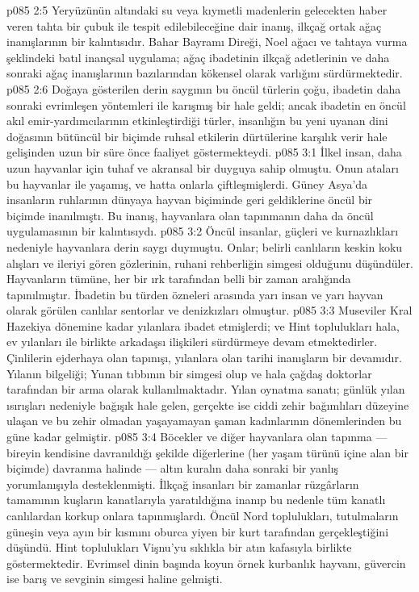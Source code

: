 \vs p085 2:5 Yeryüzünün altındaki su veya kıymetli madenlerin gelecekten haber veren tahta bir çubuk ile tespit edilebileceğine dair inanış, ilkçağ ortak ağaç inanışlarının bir kalıntısıdır. Bahar Bayramı Direği, Noel ağacı ve tahtaya vurma şeklindeki batıl inançsal uygulama; ağaç ibadetinin ilkçağ adetlerinin ve daha sonraki ağaç inanışlarının bazılarından kökensel olarak varlığını sürdürmektedir.
\vs p085 2:6 Doğaya gösterilen derin saygının bu öncül türlerin çoğu, ibadetin daha sonraki evrimleşen yöntemleri ile karışmış bir hale geldi; ancak ibadetin en öncül akıl emir\hyp{}yardımcılarının etkinleştirdiği türler, insanlığın bu yeni uyanan dini doğasının bütüncül bir biçimde ruhsal etkilerin dürtülerine karşılık verir hale gelişinden uzun bir süre önce faaliyet göstermekteydi.
\vs p085 3:1 İlkel insan, daha uzun hayvanlar için tuhaf ve akransal bir duyguya sahip olmuştu. Onun ataları bu hayvanlar ile yaşamış, ve hatta onlarla çiftleşmişlerdi. Güney Asya’da insanların ruhlarının dünyaya hayvan biçiminde geri geldiklerine öncül bir biçimde inanılmıştı. Bu inanış, hayvanlara olan tapınmanın daha da öncül uygulamasının bir kalıntısıydı.
\vs p085 3:2 Öncül insanlar, güçleri ve kurnazlıkları nedeniyle hayvanlara derin saygı duymuştu. Onlar; belirli canlıların keskin koku alışları ve ileriyi gören gözlerinin, ruhani rehberliğin simgesi olduğunu düşündüler. Hayvanların tümüne, her bir ırk tarafından belli bir zaman aralığında tapınılmıştır. İbadetin bu türden özneleri arasında yarı insan ve yarı hayvan olarak görülen canlılar sentorlar ve denizkızları olmuştur.
\vs p085 3:3 Museviler Kral Hazekiya dönemine kadar yılanlara ibadet etmişlerdi; ve Hint toplulukları hala, ev yılanları ile birlikte arkadaşsı ilişkileri sürdürmeye devam etmektedirler. Çinlilerin ejderhaya olan tapınışı, yılanlara olan tarihi inanışların bir devamıdır. Yılanın bilgeliği; Yunan tıbbının bir simgesi olup ve hala çağdaş doktorlar tarafından bir arma olarak kullanılmaktadır. Yılan oynatma sanatı; günlük yılan ısırışları nedeniyle bağışık hale gelen, gerçekte ise ciddi zehir bağımlıları düzeyine ulaşan ve bu zehir olmadan yaşayamayan şaman kadınlarının  dönemlerinden bu güne kadar gelmiştir.
\vs p085 3:4 Böcekler ve diğer hayvanlara olan tapınma --- bireyin kendisine davranıldığı şekilde diğerlerine (her yaşam türünü içine alan bir biçimde) davranma halinde --- altın kuralın daha sonraki bir yanlış yorumlanışıyla desteklenmişti. İlkçağ insanları bir zamanlar rüzgârların tamamının kuşların kanatlarıyla yaratıldığına inanıp bu nedenle tüm kanatlı canlılardan korkup onlara tapınmışlardı. Öncül Nord toplulukları, tutulmaların güneşin veya ayın bir kısmını oburca yiyen bir kurt tarafından gerçekleştiğini düşündü. Hint toplulukları Vişnu’yu sıklıkla bir atın kafasıyla birlikte göstermektedir. Evrimsel dinin başında koyun örnek kurbanlık hayvanı, güvercin ise barış ve sevginin simgesi haline gelmişti.
